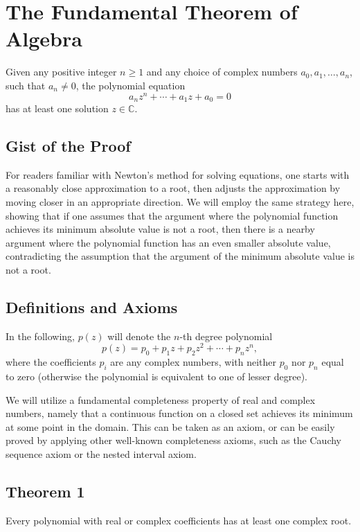 \newpage
\section{The Fundamental Theorem of Algebra}

Given any positive integer \(n \geq 1\) and any choice of complex numbers \(a_0, a_1, \ldots, a_n\), such that \(a_n \neq 0\), the polynomial equation
\[
	a_n z^n + \cdots + a_1 z + a_0 = 0 
\]
has at least one solution \(z \in \mathbb{C}\).

\subsection{Gist of the Proof}

For readers familiar with Newton’s method for solving equations, one starts with a reasonably close approximation to a root, then adjusts the approximation by moving closer in an appropriate direction. We will employ the same strategy here, showing that if one assumes that the argument where the polynomial function achieves its minimum absolute value is not a root, then there is a nearby argument where the polynomial function has an even smaller absolute value, contradicting the assumption that the argument of the minimum absolute value is not a root.

\subsection{Definitions and Axioms}
In the following, \(p(z)\) will denote the \(n\)-th degree polynomial
\[
	p(z) = p_0 + p_1 z + p_2 z^2 + \cdots + p_n z^n,
\]
where the coefficients \(p_i\) are any complex numbers, with neither \(p_0\) nor \(p_n\) equal to zero (otherwise the polynomial is equivalent to one of lesser degree).

We will utilize a fundamental completeness property of real and complex numbers, namely that a continuous function on a closed set achieves its minimum at some point in the domain. This can be taken as an axiom, or can be easily proved by applying other well-known completeness axioms, such as the Cauchy sequence axiom or the nested interval axiom.

\subsection{Theorem 1}
Every polynomial with real or complex coefficients has at least one complex root.
\vspace{\baselineskip}

